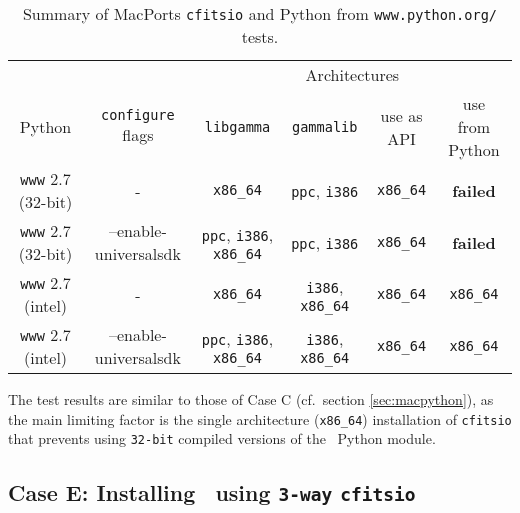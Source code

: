 \documentclass{article}[12pt,a4]
\begin{document}
\begin{table}[!h]
  \small
  \center
  \begin{tabular}{cc|cccc}
  \hline
   & & \multicolumn{4}{c}{Architectures} \\
  Python & {\tt configure} flags & {\tt libgamma} & {\tt gammalib} & use as API & use from Python \\
  \hline
  {\tt www} 2.7 (32-bit) & - & {\tt x86\_64} & {\tt ppc}, {\tt i386} & {\tt x86\_64} & {\bf failed} \\
  {\tt www} 2.7 (32-bit) & --enable-universalsdk & {\tt ppc}, {\tt i386}, {\tt x86\_64} & {\tt ppc}, {\tt i386} & {\tt x86\_64} & {\bf failed} \\
  {\tt www} 2.7 (intel) & - & {\tt x86\_64} & {\tt i386}, {\tt x86\_64} & {\tt x86\_64} & {\tt x86\_64} \\
  {\tt www} 2.7 (intel) & --enable-universalsdk & {\tt ppc}, {\tt i386}, {\tt x86\_64} & {\tt i386}, {\tt x86\_64} & {\tt x86\_64} & {\tt x86\_64} \\
  \hline
  \end{tabular}
  \caption{Summary of MacPorts {\tt cfitsio} and Python from {\tt www.python.org/}  tests.}
  \label{table:wwwpython}
\end{table}

The test results are similar to those of Case C (cf.~section \ref{sec:macpython}), as the main
limiting factor is the single architecture ({\tt x86\_64}) installation of {\tt cfitsio} that prevents using
{\tt 32-bit} compiled versions of the \this\ Python module.


\subsection{Case E: Installing \this\ using {\tt 3-way} {\tt cfitsio}}
\end{document}
